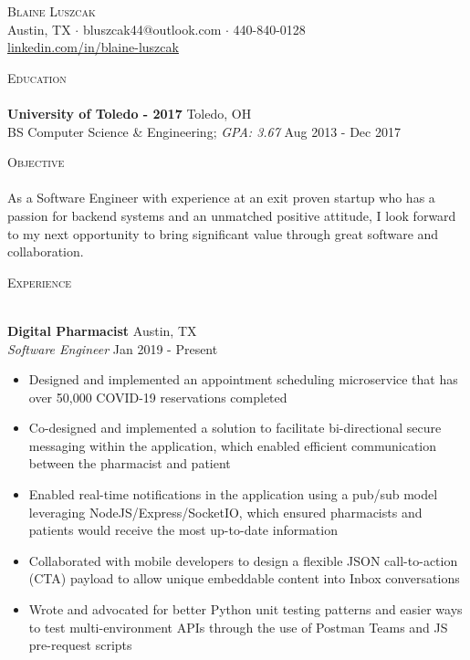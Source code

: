 \documentclass[a4paper]{article}
\newcommand{\lineunder} {
    \vspace*{-8pt} \\
    \hspace*{-18pt} \hrulefill \\
}
\newcommand{\header} [1] {
    {\hspace*{-18pt}\vspace*{6pt} \textsc{#1}}
    \vspace*{-6pt} \lineunder
}
\begin{document}
\vspace*{-40pt}

\vspace*{-10pt}
\begin{center}
    {\Huge \scshape {Blaine Luszcak}}\\
    Austin, TX $\cdot$ bluszcak44@outlook.com $\cdot$ 440-840-0128 \\
    \url{linkedin.com/in/blaine-luszcak}
\end{center}

\header{Education}
\textbf{University of Toledo - 2017} \hfill Toledo, OH \\
BS Computer Science \& Engineering; \textit{GPA: 3.67} \hfill Aug 2013 - Dec 2017 \\
\vspace{2mm}

\header{Objective}
As a Software Engineer with experience at an exit proven startup who has a passion for backend systems and an
unmatched positive attitude, I look forward to my next opportunity to bring significant value through great software and
collaboration.

\vspace{2mm}

\header{Experience}
\vspace{1mm}

\textbf{Digital Pharmacist} \hfill Austin, TX \\
\textit{Software Engineer} \hfill Jan 2019 - Present \\
\vspace{-3mm}
\begin{itemize} \itemsep -0.25mm
    \item Designed and implemented an appointment scheduling microservice that has over 50,000 COVID-19 reservations
    completed
    \item Co-designed and implemented a solution to facilitate bi-directional secure messaging within the application,
    which enabled efficient communication between the pharmacist and patient
    \item Enabled real-time notifications in the application using a pub/sub model leveraging NodeJS/Express/SocketIO,
        which ensured pharmacists and patients would receive the most up-to-date information
    \item Collaborated with mobile developers to design a flexible JSON call-to-action (CTA) payload to allow unique
    embeddable content into Inbox conversations
    \item Wrote and advocated for better Python unit testing patterns and easier ways to test multi-environment APIs
    through the use of Postman Teams and JS pre-request scripts
\end{itemize}
\vspace{-2mm}
\end{document}
